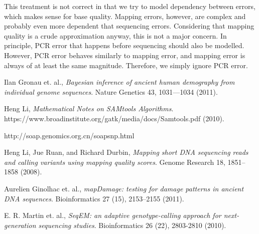 \documentclass{article}
\begin{document}
This treatment is not correct in that we try to model dependency between errors, which makes sense for base quality.  Mapping
errors, however, are complex and probably even more dependent that sequencing errors.  Considering that mapping quality is a crude
approximation anyway, this is not a major concern.  In principle, PCR
error that happens before sequencing should also be modelled.  However,
PCR error behaves similarly to mapping error, and mapping error is
always of at least the same magnitude.  Therefore, we simply ignore PCR
error.

\listoftodos

\begin{thebibliography}{9}

  Ilan Gronau et. al.,
  \emph{Bayesian inference of ancient human demography from individual genome sequences}.
  Nature Genetics 43, 1031---1034 (2011).

  Heng Li,
  \emph{Mathematical Notes on SAMtools Algorithms}.
  https://www.broadinstitute.org/gatk/media/docs/Samtools.pdf (2010).

  http://soap.genomics.org.cn/soapsnp.html

  Heng Li, Jue Ruan, and Richard Durbin,
  \emph{Mapping short DNA sequencing reads and calling variants using mapping quality scores}.
  Genome Research 18, 1851--1858 (2008). 

  Aurelien Ginolhac et. al.,
  \emph{mapDamage: testing for damage patterns in ancient DNA sequences}.
  Bioinformatics 27 (15), 2153--2155 (2011).

  E. R. Martin et. al.,
  \emph{SeqEM: an adaptive genotype-calling approach for next-generation
  sequencing studies}.
  Bioinformatics 26 (22), 2803-2810 (2010).
\end{thebibliography}
\end{document}
